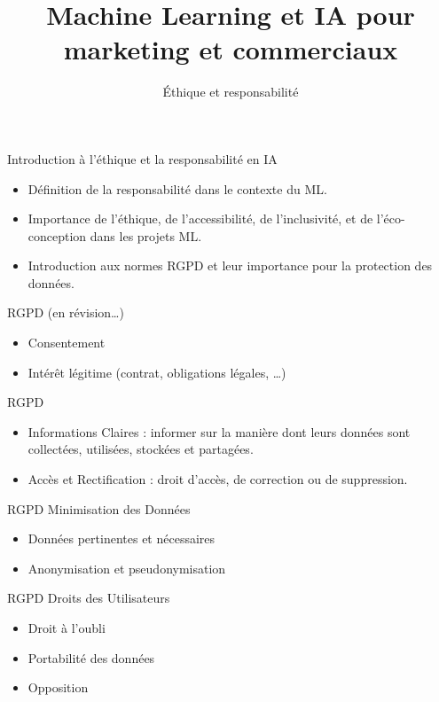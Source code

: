  \title{Machine Learning et IA pour marketing
et commerciaux} \subtitle{Éthique et responsabilité}



\begin{frame} \titlepage
\end{frame}


\begin{frame}{Introduction à l'éthique et la responsabilité en IA}
  \begin{itemize}
  \item Définition de la responsabilité dans le contexte du ML.
  \item Importance de l'éthique, de l'accessibilité, de l'inclusivité,
    et de l'éco-conception dans les projets ML.
  \item Introduction aux normes RGPD et leur importance pour la
    protection des données.
  \end{itemize}
\end{frame}

\begin{frame}{RGPD (en révision\dots)}
    \begin{itemize}
        \item {Consentement}
        \item {Intérêt légitime} (contrat, obligations légales, \dots)
    \end{itemize}
\end{frame}

\begin{frame}{RGPD}
  \begin{itemize}
  \item {Informations Claires} : informer sur la manière dont leurs données sont collectées, utilisées, stockées et partagées.
        \item {Accès et Rectification} : droit d'accès, de correction ou de suppression.
    \end{itemize}
\end{frame}

\begin{frame}{RGPD}
  Minimisation des Données
  \begin{itemize}
  \item {Données pertinentes} et nécessaires
  \item {Anonymisation et pseudonymisation}
  \end{itemize}
\end{frame}

\begin{frame}{RGPD}
  Droits des Utilisateurs

  \begin{itemize}
  \item {Droit à l'oubli}
  \item {Portabilité des données}
  \item {Opposition}
  \end{itemize}
\end{frame}

